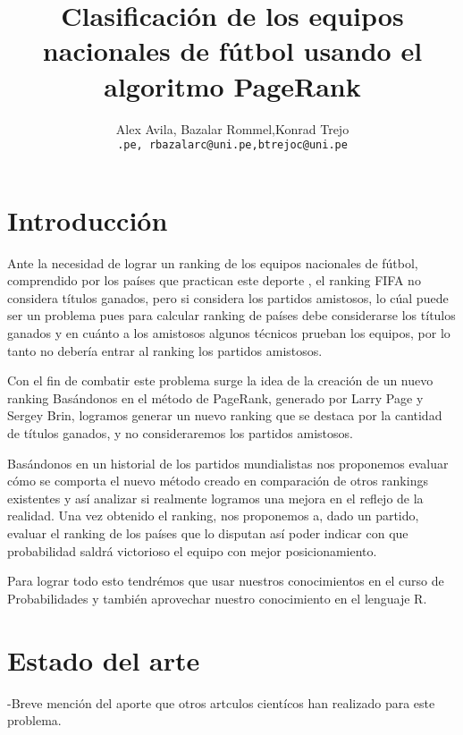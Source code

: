 \documentclass[twocolumn]{article}
\begin{document}
 

\title{
Clasificaci\'on de los equipos nacionales de f\'utbol   usando el algoritmo PageRank
}
\date{}
\author{Alex Avila, Bazalar Rommel,Konrad Trejo\\
\small{\texttt{\@aavilas@uni.pe, rbazalarc@uni.pe,btrejoc@uni.pe}}}
\maketitle



\section{Introducción}

	Ante la necesidad de lograr un ranking de los equipos nacionales de fútbol, comprendido por los países que practican este deporte , el ranking FIFA no considera títulos ganados, pero si considera los partidos amistosos, lo cúal puede ser un problema pues para calcular ranking de países debe considerarse los títulos ganados y en cuánto a los amistosos algunos técnicos prueban los equipos, por lo tanto no debería entrar al ranking los partidos amistosos.

Con el fin de combatir este problema surge la idea de la creación de un nuevo
ranking  Basándonos en el método de PageRank, generado por Larry
Page y Sergey Brin, logramos generar un nuevo ranking que se destaca por la cantidad de títulos ganados, y no consideraremos los partidos amistosos.

Basándonos en un historial de los partidos mundialistas nos proponemos evaluar cómo
se comporta el nuevo método creado en comparación de otros rankings existentes y así
analizar si realmente logramos una mejora en el reflejo de la realidad.
Una vez obtenido el ranking, nos proponemos a, dado un partido, evaluar el
ranking de los países que lo disputan  así poder indicar
con que probabilidad saldrá victorioso el equipo con mejor posicionamiento.

Para lograr todo esto tendrémos que usar nuestros conocimientos en el curso de Probabilidades y también aprovechar nuestro conocimiento en el lenguaje R.


\section{Estado del arte}
-Breve mención del aporte que otros artculos cientícos han realizado para este problema.
\end{document}
